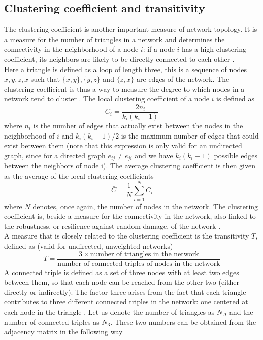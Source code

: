 \documentclass[11 pt , letterpaper , twoside , openright]{book}
\begin{document}
\subsection{Clustering coefficient and transitivity}

The clustering coefficient is another important measure of network topology. It is a measure for the number of triangles in a network and determines the connectivity in the neighborhood of a node $i$: if a node $i$ has a high clustering coefficient, its neighbors are likely to be directly connected to each other \cite{Li2017}. \\Here a triangle is defined as a loop of length three, this is a sequence of nodes $x, y, z, x$ such that $\{x, y\}, \{y, z\}$ and $\{z, x\}$ are edges of the network. The clustering coefficient is thus a way to measure the degree to which nodes in a network tend to cluster \cite{Li2017}. The local clustering coefficient of a node $i$ is defined as
\begin{equation}\label{clus}
	C_i = \frac{2n_i}{k_i(k_i-1)}
\end{equation}
where $n_i$ is the number of edges that actually exist between the nodes in the neighborhood of $i$ and $k_i(k_i-1)/2$ is the maximum number of edges that could exist between them (note that this expression is only valid for an undirected graph, since for a directed graph $e_{ij} \neq e_{ji}$ and we have $k_i(k_i-1)$ possible edges between the neighbors of node i). %
The average clustering coefficient is then given as the average of the local clustering coefficients
\begin{equation}\label{avClus}
	\bar{C} = \frac{1}{N}\sum_{i = 1}^N C_i
\end{equation}
where $N$ denotes, once again, the number of nodes in the network. The clustering coefficient is, beside a measure for the connectivity in the network, also linked to the robustness, or resilience against random damage,  of the network \cite{Iyer2013} \cite{Li2017}. \\
\newline
A measure that is closely related to the clustering coefficient is the transitivity $T$, defined as (valid for undirected, unweighted networks) \cite{F.Costa2007}
\begin{equation}\label{globalTrans}
	T = \frac{3 \times \text{number of triangles in the network}}{\text{number of connected triples of nodes in the network}}
\end{equation}
A connected triple is defined as a set of three nodes with at least two edges between them, so that each node can be reached from the other two (either directly or indirectly). The factor three arises from the fact that each triangle contributes to three different connected triples in the network: one centered at each node in the triangle \cite{F.Costa2007}. Let us denote the number of triangles as $N_{\Delta}$ and the number of connected triples as $N_3$. These two numbers can be obtained from the adjacency matrix in the following way \cite{F.Costa2007}
\end{document}
